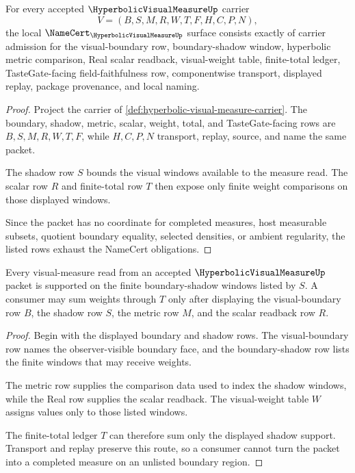 \begin{theorem}
\label{thm:hyperbolic-visual-measure-namecert-obligations}
For every accepted $\HyperbolicVisualMeasureUp$ carrier
$$
V=(B,S,M,R,W,T,F,H,C,P,N),
$$
the local $\NameCert_{\HyperbolicVisualMeasureUp}$ surface consists exactly of carrier admission for the visual-boundary row, boundary-shadow window, hyperbolic metric comparison, Real scalar readback, visual-weight table, finite-total ledger, TasteGate-facing field-faithfulness row, componentwise transport, displayed replay, package provenance, and local naming.
\end{theorem}
\begin{proof}
Project the carrier of \autoref{def:hyperbolic-visual-measure-carrier}. The boundary, shadow, metric, scalar, weight, total, and TasteGate-facing rows are $B,S,M,R,W,T,F$, while $H,C,P,N$ transport, replay, source, and name the same packet.

The shadow row $S$ bounds the visual windows available to the measure read. The scalar row $R$ and finite-total row $T$ then expose only finite weight comparisons on those displayed windows.

Since the packet has no coordinate for completed measures, host measurable subsets, quotient boundary equality, selected densities, or ambient regularity, the listed rows exhaust the NameCert obligations.
\end{proof}

\begin{theorem}
\label{thm:hyperbolic-visual-measure-shadow-support}
Every visual-measure read from an accepted $\HyperbolicVisualMeasureUp$ packet is supported on the finite boundary-shadow windows listed by $S$. A consumer may sum weights through $T$ only after displaying the visual-boundary row $B$, the shadow row $S$, the metric row $M$, and the scalar readback row $R$.
\end{theorem}
\begin{proof}
Begin with the displayed boundary and shadow rows. The visual-boundary row names the observer-visible boundary face, and the boundary-shadow row lists the finite windows that may receive weights.

The metric row supplies the comparison data used to index the shadow windows, while the Real row supplies the scalar readback. The visual-weight table $W$ assigns values only to those listed windows.

The finite-total ledger $T$ can therefore sum only the displayed shadow support. Transport and replay preserve this route, so a consumer cannot turn the packet into a completed measure on an unlisted boundary region.
\end{proof}

